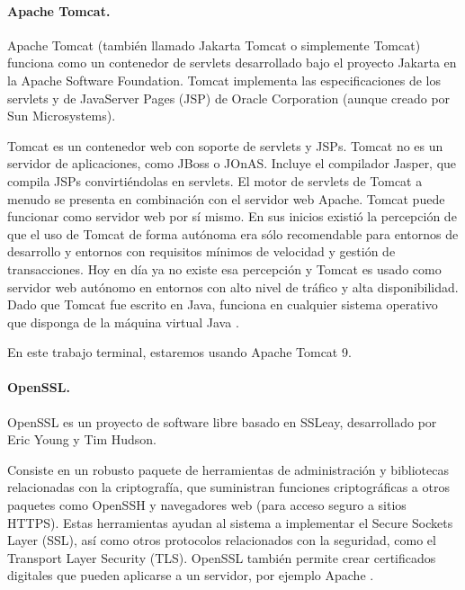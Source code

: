 \documentclass[12pt, a4paper, titlepage]{report}
\begin{document}
		    \paragraph{Apache Tomcat.\\}
		    Apache Tomcat (también llamado Jakarta Tomcat o simplemente Tomcat) funciona como un contenedor de servlets desarrollado bajo el proyecto Jakarta en la Apache Software Foundation. Tomcat implementa las especificaciones de los servlets y de JavaServer Pages (JSP) de Oracle Corporation (aunque creado por Sun Microsystems).
		    
		    Tomcat es un contenedor web con soporte de servlets y JSPs. Tomcat no es un servidor de aplicaciones, como JBoss o JOnAS. Incluye el compilador Jasper, que compila JSPs convirtiéndolas en servlets. El motor de servlets de Tomcat a menudo se presenta en combinación con el servidor web Apache. Tomcat puede funcionar como servidor web por sí mismo. En sus inicios existió la percepción de que el uso de Tomcat de forma autónoma era sólo recomendable para entornos de desarrollo y entornos con requisitos mínimos de velocidad y gestión de transacciones. Hoy en día ya no existe esa percepción y Tomcat es usado como servidor web autónomo en entornos con alto nivel de tráfico y alta disponibilidad. Dado que Tomcat fue escrito en Java, funciona en cualquier sistema operativo que disponga de la máquina virtual Java \cite{refTomcat}.
		    
		    En este trabajo terminal, estaremos usando Apache Tomcat 9.
		    
		    \paragraph{OpenSSL.\\}
		    OpenSSL es un proyecto de software libre basado en SSLeay, desarrollado por Eric Young y Tim Hudson.
            
            Consiste en un robusto paquete de herramientas de administración y bibliotecas relacionadas con la criptografía, que suministran funciones criptográficas a otros paquetes como OpenSSH y navegadores web (para acceso seguro a sitios HTTPS). Estas herramientas ayudan al sistema a implementar el Secure Sockets Layer (SSL), así como otros protocolos relacionados con la seguridad, como el Transport Layer Security (TLS). OpenSSL también permite crear certificados digitales que pueden aplicarse a un servidor, por ejemplo Apache \cite{opensslmillones}.

\end{document}
